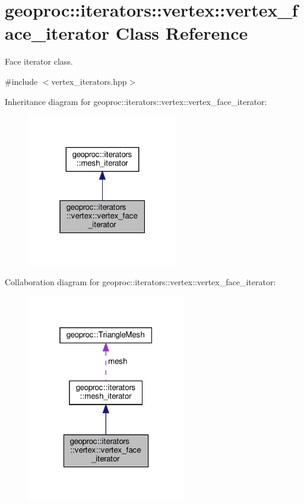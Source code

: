 \hypertarget{classgeoproc_1_1iterators_1_1vertex_1_1vertex__face__iterator}{}\section{geoproc\+:\+:iterators\+:\+:vertex\+:\+:vertex\+\_\+face\+\_\+iterator Class Reference}
\label{classgeoproc_1_1iterators_1_1vertex_1_1vertex__face__iterator}


Face iterator class.  




{\ttfamily \#include $<$vertex\+\_\+iterators.\+hpp$>$}



Inheritance diagram for geoproc\+:\+:iterators\+:\+:vertex\+:\+:vertex\+\_\+face\+\_\+iterator\+:\nopagebreak
\begin{figure}[H]
\begin{center}
\leavevmode
\includegraphics[width=187pt]{classgeoproc_1_1iterators_1_1vertex_1_1vertex__face__iterator__inherit__graph}
\end{center}
\end{figure}


Collaboration diagram for geoproc\+:\+:iterators\+:\+:vertex\+:\+:vertex\+\_\+face\+\_\+iterator\+:\nopagebreak
\begin{figure}[H]
\begin{center}
\leavevmode
\includegraphics[width=196pt]{classgeoproc_1_1iterators_1_1vertex_1_1vertex__face__iterator__coll__graph}
\end{center}
\end{figure}
